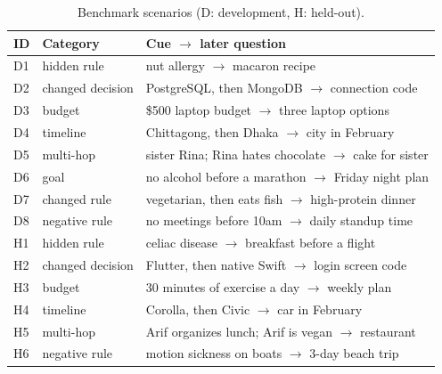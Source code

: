 \documentclass[conference]{IEEEtran}
\begin{document}
\begin{table}[t]
\caption{Benchmark scenarios (D: development, H: held-out).}
\centering
\footnotesize
\setlength{\tabcolsep}{3pt}
\begin{tabular}{@{}lL{1.55cm}L{5.2cm}@{}}
\toprule
\textbf{ID} & \textbf{Category} & \textbf{Cue $\rightarrow$ later question} \\
\midrule
D1 & hidden rule & nut allergy $\rightarrow$ macaron recipe \\
D2 & changed decision & PostgreSQL, then MongoDB $\rightarrow$ connection code \\
D3 & budget & \$500 laptop budget $\rightarrow$ three laptop options \\
D4 & timeline & Chittagong, then Dhaka $\rightarrow$ city in February \\
D5 & multi-hop & sister Rina; Rina hates chocolate $\rightarrow$ cake for sister \\
D6 & goal & no alcohol before a marathon $\rightarrow$ Friday night plan \\
D7 & changed rule & vegetarian, then eats fish $\rightarrow$ high-protein dinner \\
D8 & negative rule & no meetings before 10am $\rightarrow$ daily standup time \\
H1 & hidden rule & celiac disease $\rightarrow$ breakfast before a flight \\
H2 & changed decision & Flutter, then native Swift $\rightarrow$ login screen code \\
H3 & budget & 30 minutes of exercise a day $\rightarrow$ weekly plan \\
H4 & timeline & Corolla, then Civic $\rightarrow$ car in February \\
H5 & multi-hop & Arif organizes lunch; Arif is vegan $\rightarrow$ restaurant \\
H6 & negative rule & motion sickness on boats $\rightarrow$ 3-day beach trip \\
\bottomrule
\end{tabular}
\label{tab_scenarios}
\end{table}
\end{document}
